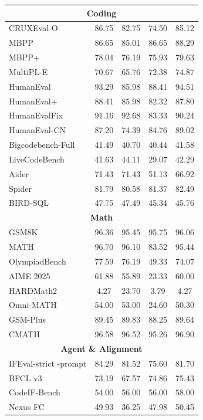\begin{table}[htbp]
{\begin{tabular}{lcccc}
\midrule
\multicolumn{5}{c}{\textbf{Coding}} \\
\midrule
CRUXEval-O & 86.75 & 82.75 & 74.50 & 85.12 \\
MBPP & 86.65 & 85.01 & 86.65 & 88.29 \\
MBPP+ & 78.04 & 76.19 & 75.93 & 79.63 \\
MultiPL-E & 70.67 & 65.76 & 72.38 & 74.87 \\
HumanEval & 93.29 & 85.98 & 88.41 & 94.51 \\
HumanEval+ & 88.41 & 85.98 & 82.32 & 87.80 \\
HumanEvalFix & 91.16 & 92.68 & 83.33 & 90.24 \\
HumanEval-CN & 87.20 & 74.39 & 84.76 & 89.02 \\
Bigcodebench-Full & 41.49 & 40.70 & 40.44 & 41.58 \\
LiveCodeBench & 41.63 & 44.11 & 29.07 & 42.29 \\
Aider & 71.43 & 71.43 & 51.13 & 66.92 \\
Spider & 81.79 & 80.58 & 81.37 & 82.49 \\
BIRD-SQL & 47.75 & 47.49 & 45.34 & 45.76 \\
\midrule
\multicolumn{5}{c}{\textbf{Math}} \\
\midrule
GSM8K & 96.36 & 95.45 & 95.75 & 96.06 \\
MATH & 96.70 & 96.10 & 83.52 & 95.44 \\
OlympiadBench & 77.59 & 76.19 & 49.33 & 74.07 \\
AIME 2025 & 61.88 & 55.89 & 23.33 & 60.00 \\
HARDMath2 & 4.27 & 23.70 & 3.79 & 4.27 \\
Omni-MATH & 54.00 & 53.00 & 24.60 & 50.30 \\
GSM-Plus & 89.45 & 89.83 & 88.25 & 89.64 \\
CMATH & 96.58 & 96.52 & 95.26 & 96.90 \\
\midrule
\multicolumn{5}{c}{\textbf{Agent \& Alignment}} \\
\midrule
IFEval-strict -prompt & 84.29 & 81.52 & 75.60 & 81.70 \\
BFCL v3 & 73.19 & 67.57 & 74.86 & 75.43 \\
CodeIF-Bench & 54.00 & 56.00 & 56.00 & 58.00 \\
Nexus FC & 49.93 & 36.25 & 47.98 & 50.45 \\
\bottomrule
\end{tabular}%
} %
\end{table}